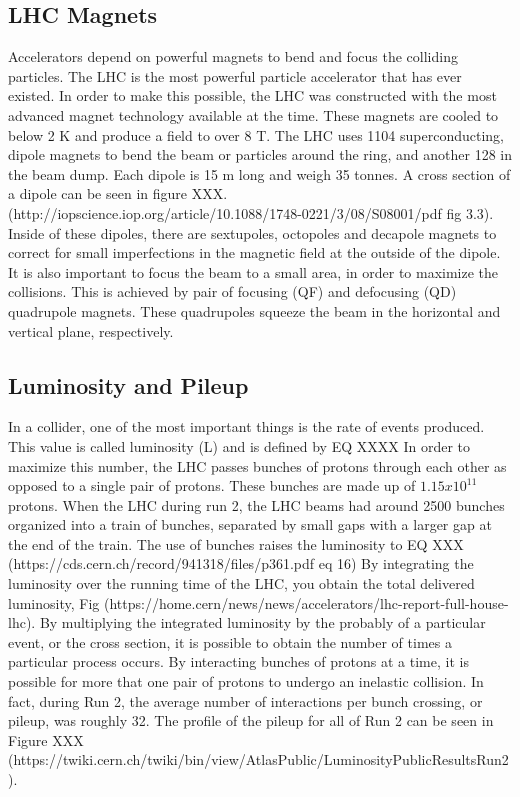 \subsection{LHC Magnets} 
Accelerators depend on powerful magnets to bend and focus the colliding particles. The LHC is the most powerful particle accelerator that has ever existed. In order to make this possible, the LHC was constructed with the most advanced magnet technology available at the time. These magnets are cooled to below 2 K and produce a field to over 8 T.\linebreak
\indent The LHC uses 1104 superconducting, dipole magnets to bend the beam or particles around the ring, and another 128 in the beam dump.  Each dipole is 15 m long and weigh 35 tonnes. A cross section of a dipole can be seen in figure XXX. (http://iopscience.iop.org/article/10.1088/1748-0221/3/08/S08001/pdf fig 3.3). Inside of these dipoles, there are sextupoles, octopoles and decapole magnets to correct for small imperfections in the magnetic field at the outside of the dipole. \linebreak
\indent	It is also important to focus the beam to a small area, in order to maximize the collisions. This is achieved by 
pair of focusing (QF) and defocusing (QD) quadrupole magnets. These quadrupoles squeeze the beam in the horizontal and vertical plane, respectively. 
\subsection{Luminosity and Pileup}
In a collider, one of the most important things is the rate of events produced. This value is called luminosity (L) and is defined by EQ XXXX
In order to maximize this number, the LHC passes bunches of protons through each other as opposed to a single pair of protons. These bunches are made up of ${1.15x10^{11}}$ protons. When the LHC during run 2, the LHC beams had around 2500 bunches organized into a train of bunches, separated by small gaps with a larger gap at the end of the train. The use of bunches raises the luminosity to EQ XXX (https://cds.cern.ch/record/941318/files/p361.pdf eq 16)
\linebreak
\indent By integrating the luminosity over the running time of the LHC, you obtain the total delivered luminosity, Fig (https://home.cern/news/news/accelerators/lhc-report-full-house-lhc). By multiplying the integrated luminosity by the probably of a particular event, or the cross section, it is possible to obtain the number of times a particular process occurs.\linebreak
\indent By interacting bunches of protons at a time, it is possible for more that one pair of protons to undergo an inelastic collision. In fact, during Run 2,  the average number of interactions per bunch crossing, or pileup, was roughly 32. The profile of the pileup for all of Run 2 can be seen in Figure XXX (https://twiki.cern.ch/twiki/bin/view/AtlasPublic/LuminosityPublicResultsRun2).


